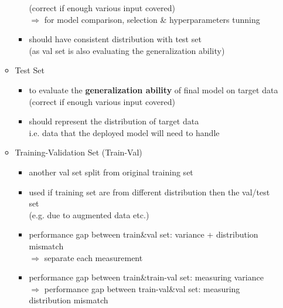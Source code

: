 \begin{itemize}
\begin{itemize}
\begin{itemize}
		(correct if enough various input covered) \\
		$\Rightarrow$ for model comparison, selection \& hyperparameters tunning
		\item should have consistent distribution with test set \\
		(as val set is also evaluating the generalization ability)
		\end{itemize}
	\item Test Set
		\begin{itemize}
		\item to evaluate the \textbf{generalization ability} of final model on target data \\
		(correct if enough various input covered)
		\item should represent the distribution of target data \\
		i.e. data that the deployed model will need to handle
		\end{itemize}
	\item Training-Validation Set (Train-Val)
		\begin{itemize}
		\item another val set split from original training set
		\item used if training set are from different distribution then the val/test set \\
		(e.g. due to augmented data etc.)
		\item performance gap between train\&val set: variance + distribution mismatch \\
		$\Rightarrow$ separate each measurement
		\item performance gap between train\&train-val set: measuring variance \\
		$\Rightarrow$ performance gap between train-val\&val set: measuring distribution mismatch
		\end{itemize}
	\end{itemize}


\end{itemize}
